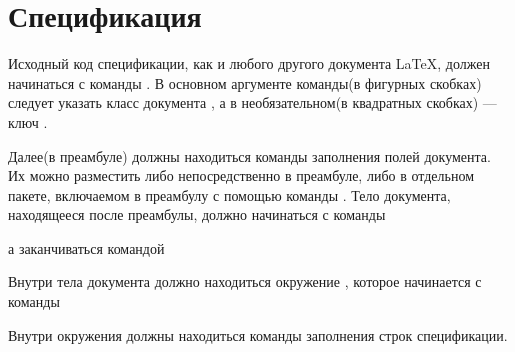 
\section{Спецификация}

Исходный код спецификации, как и любого другого документа \LaTeX{}, должен
начинаться с команды . В основном аргументе
команды(в фигурных скобках) следует указать класс документа , а в
необязательном(в квадратных скобках) --- ключ .


Далее(в преамбуле) должны находиться команды заполнения полей документа. Их можно
разместить либо непосредственно в преамбуле, либо в отдельном пакете, включаемом в
преамбулу с помощью команды . Тело документа,
находящееся после преамбулы, должно начинаться с команды

\begin{pcbdoccode}

\end{pcbdoccode}

а заканчиваться командой

\begin{pcbdoccode}

\end{pcbdoccode}

Внутри тела документа должно находиться
окружение , которое начинается с команды

\begin{pcbdoccode}
\end{pcbdoccode}

Внутри окружения  должны находиться команды заполнения строк
спецификации.

